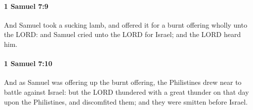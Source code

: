 		\paragraph{1 Samuel 7:9} %
			\label{1SAMUEL-7-9}

			And Samuel took a sucking lamb, and offered it for a burnt offering wholly unto the LORD: and Samuel cried unto the LORD for Israel; and the LORD heard him.


		\paragraph{1 Samuel 7:10} %
			\label{1SAMUEL-7-10}

			And as Samuel was offering up the burnt offering, the Philistines drew near to battle against Israel: but the LORD thundered with a great thunder on that day upon the Philistines, and discomfited them; and they were smitten before Israel.

